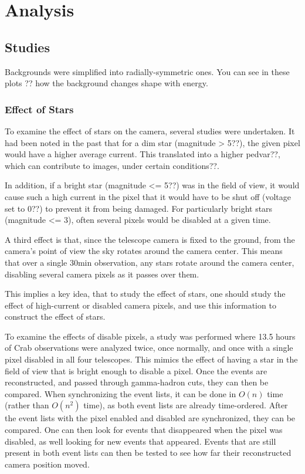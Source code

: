 \cleartooddpage[\thispagestyle{empty}]
\chapter{Analysis}

\section{Studies}
Backgrounds were simplified into radially-symmetric ones.
You can see in these plots ?? how the background changes shape with energy.


\subsection{Effect of Stars}
To examine the effect of stars on the camera, several studies were undertaken.
It had been noted in the past that for a dim star (magnitude > 5??), the given pixel would have a higher average current.
This translated into a higher pedvar??, which can contribute to images, under certain conditions??.

In addition, if a bright star (magnitude <= 5??) was in the field of view, it would cause such a high current in the pixel that it would have to be shut off (voltage set to 0??) to prevent it from being damaged.
For particularly bright stars (magnitude <= 3), often several pixels would be disabled at a given time.

A third effect is that, since the telescope camera is fixed to the ground, from the camera's point of view the sky rotates around the camera center.
This means that over a single 30min observation, any stars rotate around the camera center, disabling several camera pixels as it passes over them.

This implies a key idea, that to study the effect of stars, one should study the effect of high-current or disabled camera pixels, and use this information to construct the effect of stars.

To examine the effects of disable pixels, a study was performed where 13.5 hours of Crab observations were analyzed twice, once normally, and once with a single pixel disabled in all four telescopes.
This mimics the effect of having a star in the field of view that is bright enough to disable a pixel.
Once the events are reconstructed, and passed through gamma-hadron cuts, they can then be compared.
When synchronizing the event lists, it can be done in $O\left(n\right)$ time (rather than $O\left(n^2\right)$ time), as both event lists are already time-ordered.
After the event lists with the pixel enabled and disabled are synchronized, they can be compared.
One can then look for events that disappeared when the pixel was disabled, as well looking for new events that appeared.
Events that are still present in both event lists can then be tested to see how far their reconstructed camera position moved.

